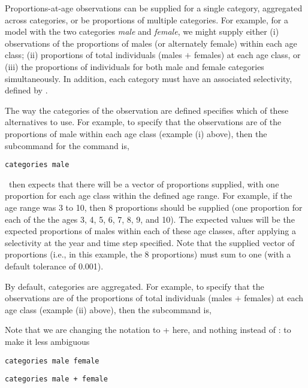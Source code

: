 Proportions-at-age observations can be supplied for a single category, aggregated across categories, or be proportions of multiple categories. For example, for a model with the two categories \emph{male} and \emph{female}, we might supply either (i) observations of the proportions of males (or alternately female) within each age class; (ii) proportions of total individuals (males $+$ females) at each age class, or (iii) the proportions of individuals for both male and female categories simultaneously. In addition, each category must have an associated selectivity, defined by . 

The way the categories of the observation are defined specifies which of these alternatives to use. For example, to specify that the observations are of the proportions of male within each age class (example (i) above), then the subcommand  for the  command is,

\begin{verbatim}
categories male
\end{verbatim}

\SPM\ then expects that there will be a vector of proportions supplied, with one proportion for each age class within the defined age range. For example, if the age range was 3 to 10, then 8 proportions should be supplied (one proportion for each of the the ages 3, 4, 5, 6, 7, 8, 9, and 10). The expected values will be the expected proportions of males within each of these age classes, after applying a selectivity at the year and time step specified. Note that the supplied vector of proportions (i.e., in this example, the 8 proportions) must sum to one (with a default tolerance of 0.001).

By default, categories are aggregated. For example, to specify that the observations are of the proportions of total individuals (males $+$ females) at each age class (example (ii) above), then the subcommand  is,

\TOUNDO

Note that we are changing the notation to + here, and nothing instead of : to make it less ambiguous

\begin{verbatim}
categories male female
\end{verbatim}

\TOUNDOend

\TODO

\begin{verbatim}
categories male + female
\end{verbatim}

